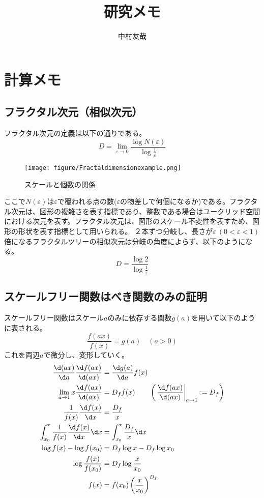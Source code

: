 \documentclass{ltjsarticle}
\title{研究メモ}
\author{中村友哉}
\begin{document}
\maketitle
\section{計算メモ}
\subsection{フラクタル次元（相似次元）}
フラクタル次元の定義は以下の通りである。
\begin{equation}
  D=\lim_{\varepsilon \to 0}\frac{\log N(\varepsilon)}{\log \frac{1}{\varepsilon}}
\end{equation}
\begin{wrapfigure}{r}[0pt]{0.33\textwidth}
  \begin{center}
    \texttt{[image: figure/Fractaldimensionexample.png]}
  \end{center}
  \caption{スケールと個数の関係}
  \label{fig:相似次元の考え方}
\end{wrapfigure}
ここで$N(\varepsilon)$は$\varepsilon$で覆われる点の数($\varepsilon$の物差しで何個になるか)である。フラクタル次元は、図形の複雑さを表す指標であり、整数である場合はユークリッド空間における次元を表す。フラクタル次元は、図形のスケール不変性を表すため、図形の形状を表す指標として用いられる。
２本ずつ分岐し、長さが$\varepsilon~(0<\varepsilon<1)$倍になるフラクタルツリーの相似次元は分岐の角度によらず、以下のようになる。
\begin{equation}
  D=\frac{\log 2}{\log \frac{1}{\varepsilon}}
\end{equation}
\subsection{スケールフリー関数はべき関数のみの証明}
スケールフリー関数はスケール$a$のみに依存する関数$g(a)$を用いて以下のように表される。
\begin{equation}
  \frac{f(ax)}{f(x)}=g(a) \quad (a>0)
\end{equation}
これを両辺$a$で微分し、変形していく。
\begin{equation}
  \begin{split}
    \frac{\d (ax)}{\d a}\frac{\d f(ax)}{\d (ax)}&=\frac{\d g(a)}{\d a}f(x)\\
    \lim_{a\to 1}x\frac{\d f(ax)}{\d (ax)}&=D_f f(x) \qquad\left(\left.\frac{\d f(ax)}{\d (ax)}\right|_{a\to1}:=D_f\right)\\
    \frac{1}{f(x)}\frac{\d f(x)}{\d x}&=\frac{D_f}{x}\\
    \int_{x_0}^{x} \frac{1}{f(x)}\frac{\d f(x)}{\d x}\d x&=\int_{x_0}^{x} \frac{D_f}{x}\d x\\
    \log f(x)-\log f(x_0)&=D_f\log x-D_f\log x_0\\
    \log \frac{f(x)}{f(x_0)}&=D_f\log \frac{x}{x_0}\\
    f(x)&=f(x_0)\left(\frac{x}{x_0}\right)^{D_f}
  \end{split}
\end{equation}
\end{document}
